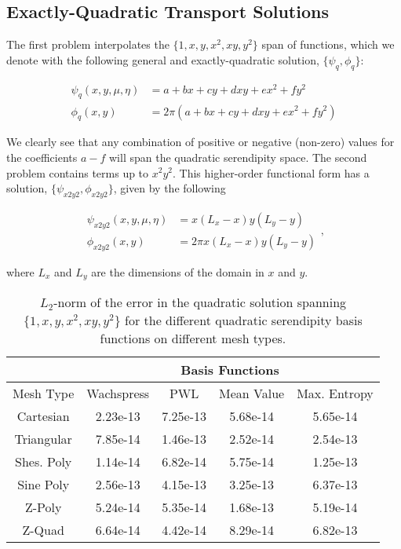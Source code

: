 \documentclass[preprint,10pt]{elsarticle}
\begin{document}
\subsection{Exactly-Quadratic Transport Solutions}

The first problem interpolates the $\{ 1, x, y, x^2, xy, y^2 \}$ span of functions, which we denote with the following general and exactly-quadratic solution, $\{\psi_q, \phi_q\}$:

\begin{equation}
\label{eq::Results_Quadratic_fluxsols}
\begin{aligned}
\psi_q (x,y,\mu,\eta) &= a + bx + c y+ d xy + e x^2 + fy^2 \\
\phi_q (x,y) &= 2 \pi \left(  a + bx + c y+ d xy + e x^2 + fy^2 \right)
\end{aligned} 
\end{equation}

\noindent We clearly see that any combination of positive or negative (non-zero) values for the coefficients $a-f$ will span the quadratic serendipity space. The second problem contains terms up to $x^2 y^2$. This higher-order functional form has a solution, $\{ \psi_{x2y2}, \phi_{x2y2}\}$, given by the following

\begin{equation}
\label{eq::Results_x2y2_fluxsols}
\begin{aligned}
\psi_{x2y2} (x,y,\mu,\eta) &= x \left(L_x - x \right) y \left(L_y - y \right) \\
\phi_{x2y2} (x,y) &= 2 \pi x \left(L_x - x \right) y \left(L_y - y \right) 
\end{aligned} ,
\end{equation}

\noindent where $L_x$ and $L_y$ are the dimensions of the domain in $x$ and $y$.

\begin{table}[hbt]
\caption{$L_2$-norm of the error in the quadratic solution spanning $\{ 1, x, y, x^2, xy, y^2 \}$ for the different quadratic serendipity basis functions on different mesh types.}
\centering
\def\arraystretch{1.25}
\begin{tabular}{|c|c|c|c|c|}
\hline
& \multicolumn{4}{c}{Basis Functions}\vline\\
\hline
Mesh Type & Wachspress & PWL& Mean Value& Max. Entropy \\
\hline
Cartesian&2.23e-13&7.25e-13&5.68e-14&5.65e-14\\
Triangular&7.85e-14&1.46e-13&2.52e-14&2.54e-13\\
Shes. Poly&1.14e-14&6.82e-14&5.75e-14&1.25e-13\\
Sine Poly&2.56e-13&4.15e-13&3.25e-13&6.37e-13\\
Z-Poly&5.24e-14&5.35e-14&1.68e-13&5.19e-14\\
Z-Quad&6.64e-14&4.42e-14&8.29e-14&6.82e-13\\
\hline
\end{tabular}
\end{table}
\end{document}
